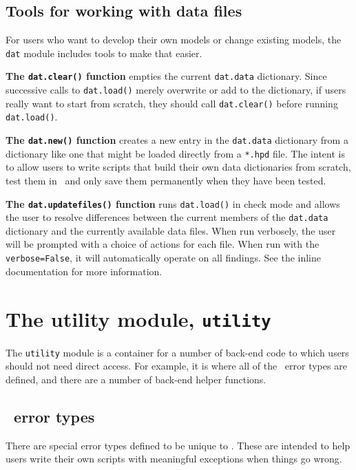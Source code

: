 \subsection{Tools for working with data files}\label{sec:dat:tools}

For users who want to develop their own models or change existing models, the \texttt{dat} module includes tools to make that easier.  

{\bf The \texttt{dat.clear()} function} empties the current \texttt{dat.data} dictionary.  Since successive calls to \texttt{dat.load()} merely overwrite or add to the dictionary, if users really want to start from scratch, they should call \texttt{dat.clear()} before running \texttt{dat.load()}.

{\bf The \texttt{dat.new()} function} creates a new entry in the \texttt{dat.data} dictionary from a dictionary like one that might be loaded directly from a \texttt{*.hpd} file.  The intent is to allow users to write scripts that build their own data dictionaries from scratch, test them in \PM\ and only save them permanently when they have been tested.

{\bf The \texttt{dat.updatefiles()} function} runs \texttt{dat.load()} in check mode and allows the user to resolve differences between the current members of the \texttt{dat.data} dictionary and the currently available data files.  When run verbosely, the user will be prompted with a choice of actions for each file.  When run with the \texttt{verbose=False}, it will automatically operate on all findings.  See the inline documentation for more information.

\section{The utility module, \texttt{utility}}

The \texttt{utility} module is a container for a number of back-end code to which users should not need direct access.  For example, it is where all of the \PM\ error types are defined, and there are a number of back-end helper functions.

\subsection{\PM\ error types}

There are special error types defined to be unique to \PM.  These are intended to help users write their own scripts with meaningful exceptions when things go wrong.

